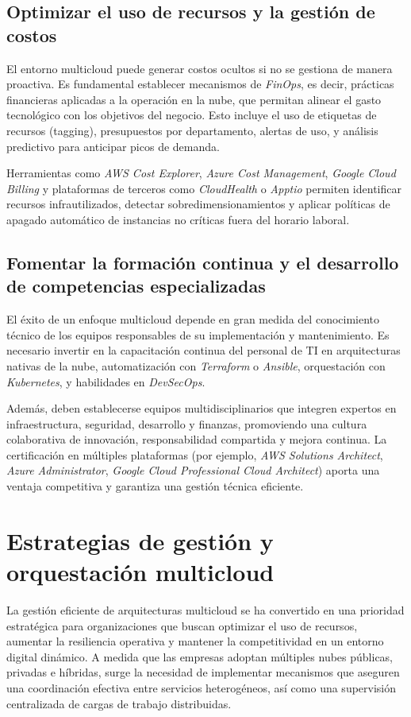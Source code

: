 {        \subsection{Optimizar el uso de recursos y la gestión de costos}
            El entorno multicloud puede generar costos ocultos si no se gestiona de manera proactiva. Es fundamental establecer mecanismos de \textit{FinOps}, es decir, prácticas financieras aplicadas a la operación en la nube, que permitan alinear el gasto tecnológico con los objetivos del negocio. Esto incluye el uso de etiquetas de recursos (tagging), presupuestos por departamento, alertas de uso, y análisis predictivo para anticipar picos de demanda.
            
            Herramientas como \textit{AWS Cost Explorer}, \textit{Azure Cost Management}, \textit{Google Cloud Billing} y plataformas de terceros como \textit{CloudHealth} o \textit{Apptio} permiten identificar recursos infrautilizados, detectar sobredimensionamientos y aplicar políticas de apagado automático de instancias no críticas fuera del horario laboral.
            
        \subsection{Fomentar la formación continua y el desarrollo de competencias especializadas}
            El éxito de un enfoque multicloud depende en gran medida del conocimiento técnico de los equipos responsables de su implementación y mantenimiento. Es necesario invertir en la capacitación continua del personal de TI en arquitecturas nativas de la nube, automatización con \textit{Terraform} o \textit{Ansible}, orquestación con \textit{Kubernetes}, y habilidades en \textit{DevSecOps}.
            
            Además, deben establecerse equipos multidisciplinarios que integren expertos en infraestructura, seguridad, desarrollo y finanzas, promoviendo una cultura colaborativa de innovación, responsabilidad compartida y mejora continua. La certificación en múltiples plataformas (por ejemplo, \textit{AWS Solutions Architect}, \textit{Azure Administrator}, \textit{Google Cloud Professional Cloud Architect}) aporta una ventaja competitiva y garantiza una gestión técnica eficiente.

    \section{Estrategias de gestión y orquestación multicloud}
        La gestión eficiente de arquitecturas multicloud se ha convertido en una prioridad estratégica para organizaciones que buscan optimizar el uso de recursos, aumentar la resiliencia operativa y mantener la competitividad en un entorno digital dinámico. A medida que las empresas adoptan múltiples nubes públicas, privadas e híbridas, surge la necesidad de implementar mecanismos que aseguren una coordinación efectiva entre servicios heterogéneos, así como una supervisión centralizada de cargas de trabajo distribuidas.
            
}
